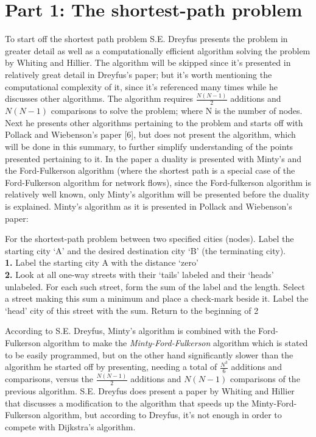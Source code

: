 \documentclass{article}
\begin{document}
\section{Part 1: The shortest-path problem}
To start off the shortest path problem S.E. Dreyfus presents the problem in greater detail
as well as a computationally efficient algorithm solving the problem by Whiting and Hillier.
The algorithm will be skipped since it's presented in relatively great detail in Dreyfus's paper;
but it's worth mentioning the computational complexity of it, since it's referenced many times
while he discusses other algorithms. The algorithm requires $\frac{N(N-1)}{2}$ additions and $N(N-1)$ 
comparisons to solve the problem; where N is the number of nodes. Next he presents other
algorithms pertaining to the problem and starts off with Pollack and Wiebenson's paper [6], but does not present the algorithm, which will be done in this summary, to 
further simplify understanding of the points presented pertaining to it. In the paper a duality 
is presented with Minty's and the Ford-Fulkerson algorithm (where the shortest path is a special case of
the Ford-Fulkerson algorithm for network flows), since the Ford-fulkerson algorithm is relatively well
known, only Minty's algorithm will be presented before the duality is explained. Minty's algorithm 
as it is presented in Pollack and Wiebenson's paper: 
\vspace{2mm}

\noindent For the shortest-path problem between two specified cities (nodes).
Label the starting city `A' and the desired destination city `B' (the terminating city). \\
\indent \textbf{1.} Label the starting city A with the distance `zero' \\
\indent \textbf{2.} Look at all one-way streets with their `tails' labeled
and their `heads' unlabeled. For each such street, form the sum of the label and the length. Select a
street making this sum a minimum and place a check-mark beside it. Label the
`head' city of this street with the sum. Return to the beginning of 2 

\vspace{2mm}

\noindent According to S.E. Dreyfus, Minty's algorithm is combined with the Ford-Fulkerson
algorithm to make the \textit{Minty-Ford-Fulkerson} algorithm which is stated to be
easily programmed, but on the other hand significantly slower than the algorithm he
started off by presenting, needing a total of $\frac{N^{3}}{6}$ additions and comparisons, versus
the $\frac{N(N-1)}{2}$ additions and $N(N-1)$ comparisons of the previous algorithm. S.E. Dreyfus does
present a paper by Whiting and Hillier that discusses a modification to the algorithm
that speeds up the Minty-Ford-Fulkerson algorithm, but according to Dreyfus, it's not
enough in order to compete with Dijkstra's algorithm.
\end{document}
